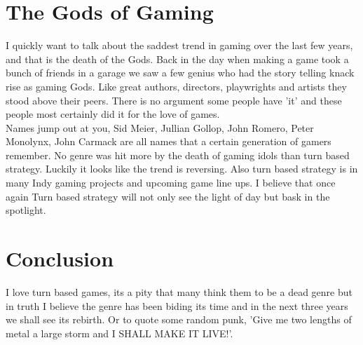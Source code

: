 \documentclass[a4paper]{article}
\begin{document}
\section{The Gods of Gaming}
I quickly want to talk about the saddest trend in gaming over the last few years, and that is the death of the Gods. Back in the day when making a game took a bunch of friends in a garage we saw a few genius who had the story telling knack rise as gaming Gods. Like great authors, directors, playwrights and artists they stood above their peers. There is no argument some people have 'it' and these people most certainly did it for the love of games.\\
Names jump out at you, Sid Meier, Jullian Gollop, John Romero, Peter Monolynx, John Carmack are all names that a certain generation of gamers remember. No genre was hit more by the death of gaming idols than turn based strategy. Luckily it looks like the trend is reversing. Also turn based strategy is in many Indy gaming projects and upcoming game line ups. I believe that once again Turn based strategy will not only see the light of day but bask in the spotlight.

\section{Conclusion}
I love turn based games, its a pity that many think them to be a dead genre but in truth I believe the genre has been biding its time and in the next three years we shall see its rebirth. Or to quote some random punk, 'Give me two lengths of metal a large storm and I SHALL MAKE IT LIVE!'.
\end{document}
